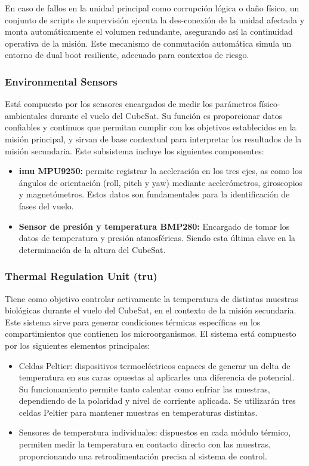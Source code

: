     En caso de fallos en la unidad principal como corrupción lógica o daño físico, un conjunto de scripts de
    supervisión ejecuta la des-conexión de la unidad afectada y monta automáticamente el volumen
    redundante, asegurando así la continuidad operativa de la misión. Este mecanismo de conmutación automática
    simula un entorno de dual boot resiliente, adecuado para contextos de riesgo.

  \subsubsection{Environmental Sensors}
    Está compuesto por los sensores encargados de medir los parámetros
    físico-ambientales durante el vuelo del CubeSat. Su función es proporcionar datos confiables y continuos que
    permitan cumplir con los objetivos establecidos en la misión principal, y sirvan de base contextual para
    interpretar los resultados de la misión secundaria.  Este subsistema incluye los siguientes componentes:
  \begin{itemize}
    \item \textbf{\acrfull{imu} MPU9250:} permite registrar la aceleración en los tres ejes, as como
      los ángulos de orientación (roll, pitch y yaw) mediante acelerómetros, giroscopios y magnetómetros. Estos
      datos son fundamentales para la identificación de fases del vuelo.

    \item \textbf{Sensor de presión y temperatura BMP280:} Encargado de tomar los datos de temperatura y presión
      atmosféricas. Siendo esta última clave en la determinación de la altura del CubeSat.
  \end{itemize}

  \subsubsection{Thermal Regulation Unit (\acrshort{tru})}
    Tiene como objetivo controlar activamente la temperatura de distintas muestras biológicas durante el vuelo del
    CubeSat, en el contexto de la misión secundaria. Este sistema sirve para generar condiciones térmicas específicas en
    los compartimientos que contienen los microorganismos.  El sistema está compuesto por los siguientes elementos
    principales:

  \begin{itemize} 
    \item Celdas Peltier: dispositivos termoeléctricos capaces de generar un delta de temperatura en
      sus caras opuestas al aplicarles una diferencia de potencial. Su funcionamiento permite tanto calentar como
      enfriar las muestras, dependiendo de la polaridad y nivel de corriente aplicada. Se utilizarán tres celdas
      Peltier para mantener muestras en temperaturas distintas.

    \item Sensores de temperatura individuales: dispuestos en cada módulo térmico, permiten medir la temperatura en
      contacto directo con las muestras, proporcionando una retroalimentación precisa al sistema de control.
  \end{itemize}

